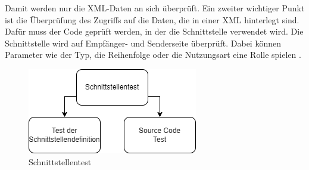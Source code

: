 Damit werden nur die XML-Daten an sich überprüft. Ein zweiter wichtiger Punkt ist die Überprüfung des Zugriffs auf die Daten, die in einer XML hinterlegt sind.
Dafür muss der Code geprüft werden, in der die Schnittstelle verwendet wird.
Die Schnittstelle wird auf Empfänger- und Senderseite überprüft. Dabei können Parameter wie der Typ, die Reihenfolge oder die Nutzungsart eine Rolle spielen \cite[vgl.][S. 228]{integration}.\par
\begin{figure}[!h]
\centering
\includegraphics[scale=.9,]{Bilder/Quicktest/Schnittstellen.drawio.png}
\caption{Schnittstellentest \cite[vgl.][S. 226]{integration}}
\end{figure}



















